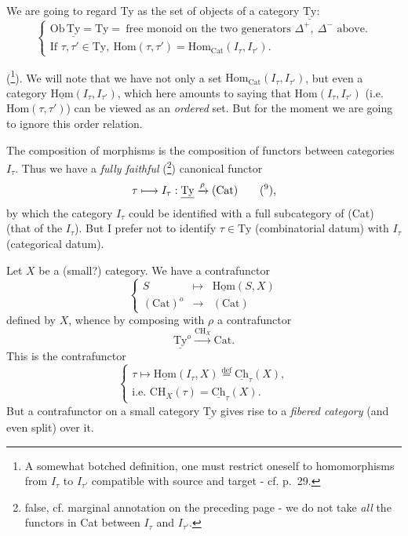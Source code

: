 \documentclass[11pt]{article}
\newcommand{\printedpage}[1]{\marginpar{\footnotesize p.~#1}}
\newcommand{\msp}[1]{\marginpar{\footnotesize [#1]}}
\newcommand{\Hom}{\mathrm{Hom}}
\newcommand{\uHom}{\underline{\mathrm{Hom}}}
\newcommand{\uCh}{\underline{\mathrm{Ch}}}
\newcommand{\Ty}{\mathrm{Ty}}
\newcommand{\uTy}{\underline{\mathrm{Ty}}}
\newcommand{\Cat}{\mathrm{Cat}}
\begin{document}
We are going to regard Ty as the set of objects of a category $\uTy$:
\[
\left\{
\begin{array}{l}
\mathrm{Ob}\,\uTy=\Ty=\ \text{free monoid on the two generators } \Delta^+,\ \Delta^- \text{ above.}\\[1ex]
\text{If } \tau,\tau'\in\Ty,\ \Hom(\tau,\tau')=\Hom_{\Cat}(I_\tau,I_{\tau'}).
\end{array}
\right.
\]

(\footnote[7]{A somewhat botched definition, one must restrict oneself to homomorphisms from $I_\tau$ to $I_{\tau'}$ compatible with source and target - cf. p.~29.}). We will note that we have not only a set $\Hom_{\Cat}(I_\tau,I_{\tau'})$, but even a category $\uHom(I_\tau,I_{\tau'})$, which here amounts to saying that $\Hom(I_\tau,I_{\tau'})$ (i.e. $\Hom(\tau,\tau')$) can be viewed as an \textit{ordered} set. But for the moment we are going to ignore this order relation.

\msp{page 26}
The composition of morphisms is the composition of functors between categories $I_\tau$. Thus we have a \textit{fully faithful} (\footnote[8]{false, cf. marginal annotation on the preceding page - we do not take \textit{all} the functors in Cat between $I_\tau$ and $I_{\tau'}$.}) canonical functor
\[
\tau \longmapsto I_\tau : \uTy \xrightarrow{\rho} (\Cat) \qquad \text{(\footnotemark[9]),}
\]
\printedpage{17}
by which the category $I_\tau$ could be identified with a full subcategory of (Cat) (that of the $I_\tau$). But I prefer not to identify $\tau\in\Ty$ (combinatorial datum) with $I_\tau$ (categorical datum).

Let $X$ be a (small?) category. We have a contrafunctor
\[
\left\{
\begin{array}{rcl}
S & \longmapsto & \uHom(S,X)\\[1ex]
(\Cat)^o & \longrightarrow & (\Cat)
\end{array}
\right.
\]
defined by $X$, whence by composing with $\rho$ a contrafunctor
\[
\uTy^{o} \xrightarrow{\mathrm{CH}_X} \Cat.
\]
This is the contrafunctor
\[
\left\{
\begin{array}{l}
\tau \longmapsto \uHom(I_\tau,X) \overset{\text{def}}{=} \uCh_\tau(X),\\[1ex]
\text{i.e. } \mathrm{CH}_X(\tau)=\uCh_\tau(X).
\end{array}
\right.
\]
But a contrafunctor on a small category $\uTy$ gives rise to a \textit{fibered category} (and even split) over it.
\end{document}
